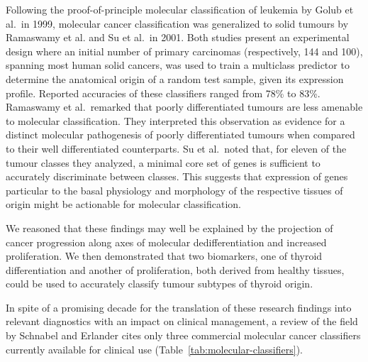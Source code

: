 Following the proof-of-principle molecular classification of leukemia by Golub
et al.~in 1999,\cite{golub_molecular_1999} molecular cancer classification was
generalized to solid tumours by Ramaswamy et al. and Su et al.~in
2001.\cite{ramaswamy_multiclass_2001,su_molecular_2001} Both studies present an
experimental design where an initial number of primary carcinomas (respectively,
144 and 100), spanning most human solid cancers, was used to train a multiclass
predictor to determine the anatomical origin of a random test sample, given its
expression profile.  Reported accuracies of these classifiers ranged from 78\%
to 83\%.  Ramaswamy et al.~remarked that poorly differentiated tumours are less
amenable to molecular classification.  They interpreted this observation as
evidence for a distinct molecular pathogenesis of poorly differentiated tumours
when compared to their well differentiated counterparts.  Su et al.~noted that,
for eleven of the tumour classes they analyzed, a minimal core set of genes is
sufficient to accurately discriminate between classes.  This suggests that
expression of genes particular to the basal physiology and morphology of the
respective tissues of origin might be actionable for molecular classification.

We reasoned that these findings may well be explained by the projection of
cancer progression along axes of molecular dedifferentiation and increased
proliferation.  We then demonstrated that two biomarkers, one of thyroid
differentiation and another of proliferation, both derived from healthy tissues,
could be used to accurately classify tumour subtypes of thyroid
origin.\cite{tomas_general_2012}

In spite of a promising decade for the translation of these research findings
into relevant diagnostics with an impact on clinical management, a review of the
field by Schnabel and Erlander\cite{schnabel_gene_2012} cites only three
commercial molecular cancer classifiers currently available for clinical use
(Table~\ref{tab:molecular-classifiers}).

